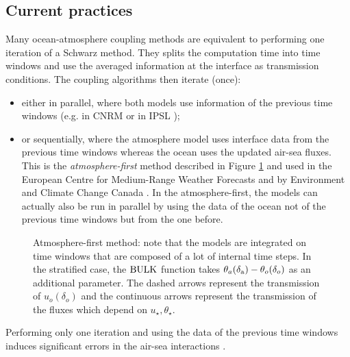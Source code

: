 \subsection{Current practices}
Many ocean-atmosphere coupling methods are equivalent to
performing one iteration of a Schwarz method.
They splits the computation time into time windows and
use the averaged information at the interface as transmission
conditions.
The coupling algorithms then iterate (once):
\begin{itemize}
	\item either in parallel, where both models use information
		of the previous time windows
		(e.g. in CNRM \citep{voldoire_cnrm-cm51_2013}
		or in IPSL \citep{marti_key_2010});
	\item or sequentially, where the atmosphere model
		uses interface data from the previous time windows
		whereas the ocean uses the updated air-sea fluxes.
		This is the \textit{atmosphere-first} method
		described in Figure \ref{fig:airseaSCM_atmFirst} and
		used in the European Centre for Medium-Range Weather
		Forecasts \citep{mogensen_coupling_2012} and by
		Environment and Climate Change Canada
		\citep{marti_schwarz_2021}.
		In the atmosphere-first,
		the models can actually also be
		run in parallel by using the data of the ocean
		not of the previous time windows but from the
		one before.
\end{itemize}
\begin{figure}
\centering
\caption{Atmosphere-first method: note that the models are
	integrated on time windows that are composed of a lot
	of internal time steps. In the stratified case, the
	${\rm BULK}$ function takes $\theta_a(\delta_{\rm a}) -
	\theta_o(\delta_o)$ as an additional parameter.
	The dashed arrows represent the transmission of
	$u_o(\delta_o)$ and the continuous arrows represent the
	transmission of the fluxes which depend on
	$u_\star, \theta_\star$.
	}
\label{fig:airseaSCM_atmFirst}
\end{figure}
Performing only one iteration and using the data of the previous
time windows induces significant errors in the air-sea
interactions \citep{marti_schwarz_2021}.
